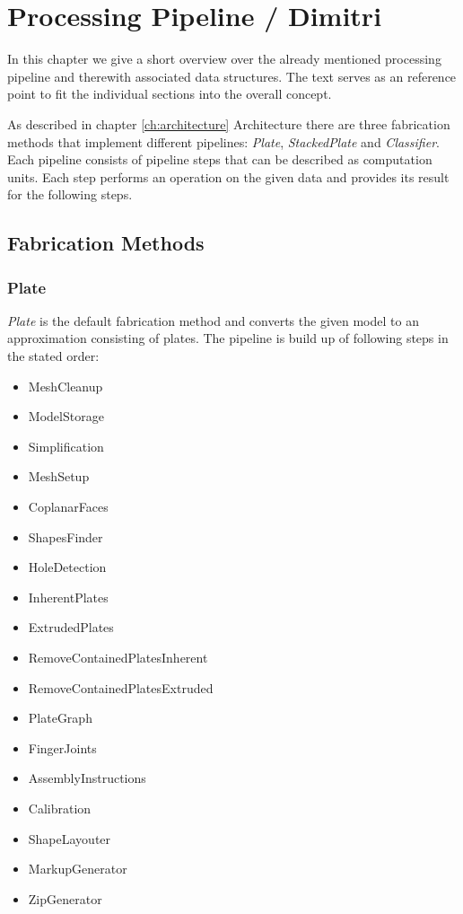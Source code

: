 \documentclass[../ClassicThesis.tex]{subfiles}
\begin{document}
\chapter{Processing Pipeline / Dimitri}\label{ch:processingPipeline}

In this chapter we give a short overview over the already mentioned processing pipeline and therewith associated data structures. The text serves as an reference point to fit the individual sections into the overall concept.

As described in chapter \ref{ch:architecture} Architecture there are three fabrication methods that implement different pipelines: \emph{Plate}, \emph{StackedPlate} and \emph{Classifier}. Each pipeline consists of pipeline steps that can be described as computation units. Each step performs an operation on the given data and provides its result for the following steps.


\section{Fabrication Methods}

\subsection{Plate}

\emph{Plate} is the default fabrication method and converts the given model to an approximation consisting of plates. The pipeline is build up of following steps in the stated order: 

\begin{itemize}
    \item MeshCleanup
    \item ModelStorage
    \item Simplification
    \item MeshSetup
    \item CoplanarFaces
    \item ShapesFinder
    \item HoleDetection
    \item InherentPlates
    \item ExtrudedPlates
    \item RemoveContainedPlatesInherent
    \item RemoveContainedPlatesExtruded
    \item PlateGraph
    \item FingerJoints
    \item AssemblyInstructions
    \item Calibration
    \item ShapeLayouter
    \item MarkupGenerator
    \item ZipGenerator
\end{itemize}
\end{document}
